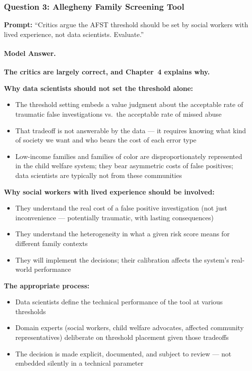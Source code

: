 \subsubsection{Question 3: Allegheny Family Screening Tool}

\textbf{Prompt:} ``Critics argue the AFST threshold should be set by social workers with lived experience, not data scientists. Evaluate.''

\paragraph{Model Answer.}

\textbf{The critics are largely correct, and Chapter~4 explains why.}

\textbf{Why data scientists should not set the threshold alone:}
\begin{itemize}
    \item The threshold setting embeds a value judgment about the acceptable rate of traumatic false investigations vs.\ the acceptable rate of missed abuse
    \item That tradeoff is not answerable by the data --- it requires knowing what kind of society we want and who bears the cost of each error type
    \item Low-income families and families of color are disproportionately represented in the child welfare system; they bear asymmetric costs of false positives; data scientists are typically not from these communities
\end{itemize}

\textbf{Why social workers with lived experience should be involved:}
\begin{itemize}
    \item They understand the real cost of a false positive investigation (not just inconvenience --- potentially traumatic, with lasting consequences)
    \item They understand the heterogeneity in what a given risk score means for different family contexts
    \item They will implement the decisions; their calibration affects the system's real-world performance
\end{itemize}

\textbf{The appropriate process:}
\begin{itemize}
    \item Data scientists define the technical performance of the tool at various thresholds
    \item Domain experts (social workers, child welfare advocates, affected community representatives) deliberate on threshold placement given those tradeoffs
    \item The decision is made explicit, documented, and subject to review --- not embedded silently in a technical parameter
\end{itemize}

